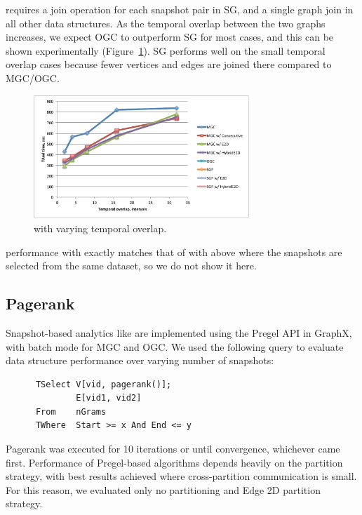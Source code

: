  requires a join operation for each snapshot pair in SG,
and a single graph join in all other data structures.  As the temporal
overlap between the two graphs increases, we expect OGC to outperform
SG for most cases, and this can be shown experimentally
(Figure~\ref{fig:tandall}).  SG performs well on the small temporal
overlap cases because fewer vertices and edges are joined there
compared to MGC/OGC.

\begin{figure}[t!]
\includegraphics[width=3.2in]{figs/tand_all_warm.pdf}
\caption{ with varying temporal overlap.}
\label{fig:tandall}
\end{figure}

 performance with  exactly matches that of
 with  above where the snapshots are selected
from the same dataset, so we do not show it here.

\subsection{Pagerank}

Snapshot-based analytics like  are implemented using
the Pregel API in GraphX, with batch mode for MGC and OGC.  We used
the following query to evaluate data structure performance over
varying number of snapshots:

\begin{small}
\begin{verbatim}
      TSelect V[vid, pagerank()];
              E[vid1, vid2]
      From    nGrams
      TWhere  Start >= x And End <= y
\end{verbatim}
\end{small}

Pagerank was executed for 10 iterations or until convergence,
whichever came first.  Performance of Pregel-based algorithms depends
heavily on the partition strategy, with best results achieved where
cross-partition communication is small.  For this reason, we evaluated
only no partitioning and Edge 2D partition strategy.

